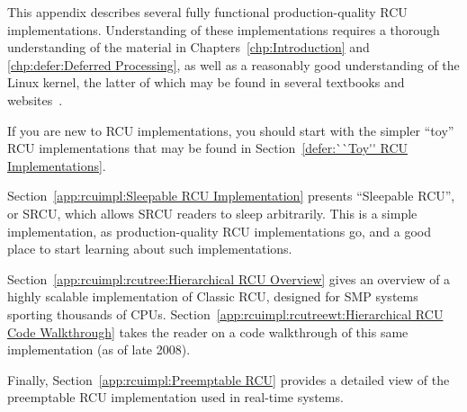

This appendix describes several fully functional production-quality RCU
implementations.
Understanding of these implementations requires a thorough understanding
of the material in
Chapters~\ref{chp:Introduction} and
\ref{chp:defer:Deferred Processing},
as well as a reasonably good understanding of the Linux kernel,
the latter of which may be found in several textbooks and
websites~\cite{BovetCesati2005,CorbetRubiniKroahHartman,CorbetLWN,RobertLove2005}.

If you are new to RCU implementations, you should start with the
simpler ``toy'' RCU implementations that may be found in
Section~\ref{defer:``Toy'' RCU Implementations}.

Section~\ref{app:rcuimpl:Sleepable RCU Implementation} presents
``Sleepable RCU'', or SRCU, which allows SRCU readers to sleep
arbitrarily.
This is a simple implementation, as production-quality RCU implementations
go, and a good place to start learning about such implementations.

Section~\ref{app:rcuimpl:rcutree:Hierarchical RCU Overview}
gives an overview of a highly scalable implementation of Classic
RCU, designed for SMP systems sporting thousands of CPUs.
Section~\ref{app:rcuimpl:rcutreewt:Hierarchical RCU Code Walkthrough}
takes the reader on a code walkthrough of this same implementation
(as of late 2008).

Finally,
Section~\ref{app:rcuimpl:Preemptable RCU}
provides a detailed view of the preemptable RCU implementation used
in real-time systems.





